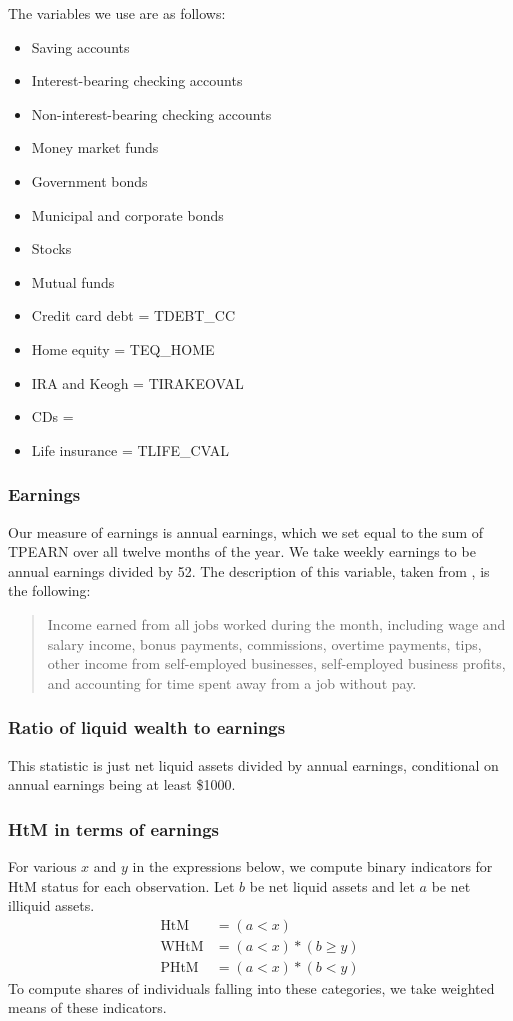 \documentclass{article}
\begin{document}
The variables we use are as follows:
\begin{itemize}
\item Saving accounts \eqindent {}
\item Interest-bearing checking accounts\eqindent  {}
\item Non-interest-bearing checking accounts\eqindent  {}
\item Money market funds\eqindent  {}
\item Government bonds\eqindent  {}
\item Municipal and corporate bonds\eqindent  {}
\item Stocks\eqindent  {}
\item Mutual funds\eqindent  {}
\item Credit card debt = TDEBT\_CC
\item Home equity = TEQ\_HOME
\item IRA and Keogh = TIRAKEOVAL
\item CDs = 
\item Life insurance = TLIFE\_CVAL
\end{itemize}

\subsubsection{Earnings}
Our measure of earnings is annual earnings, which we set equal to the sum of TPEARN over all twelve months of the year. We take weekly earnings to be annual earnings divided by 52. The description of this variable, taken from \cite{tpearn}, is the following:
\begin{quote}
Income earned from all jobs worked during the month, including wage and salary income, bonus payments, commissions, overtime payments, tips, other income from self-employed businesses, self-employed business profits, and accounting for time spent away from a job without pay.
\end{quote}

\subsubsection{Ratio of liquid wealth to earnings}
This statistic is just net liquid assets divided by annual earnings, conditional on annual earnings being at least \$1000.

\subsubsection{HtM in terms of earnings}
For various $x$ and $y$ in the expressions below, we compute binary indicators for HtM status for each observation. Let $b$ be net liquid assets and let $a$ be net illiquid assets.
\begin{align*}
\text{HtM} &= (a < x) \\
\text{WHtM} &= (a < x) * (b \geq y) \\
\text{PHtM} &= (a < x) * (b < y)
\end{align*}
To compute shares of individuals falling into these categories, we take weighted means of these indicators.
\end{document}
